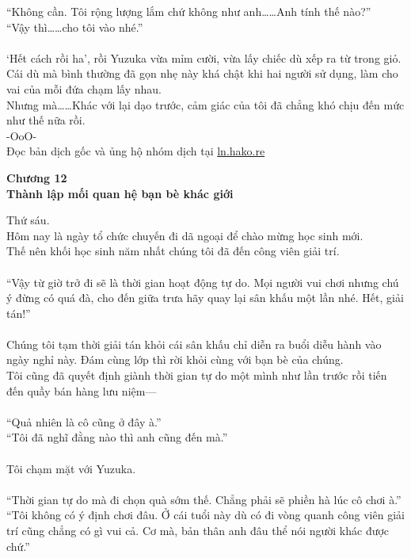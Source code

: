 \documentclass[12pt,a4paper, twosides]{book}
\begin{document}
“Không cần. Tôi rộng lượng lắm chứ không như anh……Anh tính thế nào?”\\
“Vậy thì……cho tôi vào nhé.”\\
\\
‘Hết cách rồi ha’, rồi Yuzuka vừa mỉm cười, vừa lấy chiếc dù xếp ra từ trong giỏ.\\
Cái dù mà bình thường đã gọn nhẹ này khá chật khi hai người sử dụng, làm cho vai của mỗi đứa chạm lấy nhau.\\
Nhưng mà……Khác với lại dạo trước, cảm giác của tôi đã chẳng khó chịu đến mức như thế nữa rồi.\\
-OoO-\\
Đọc bản dịch gốc và ủng hộ nhóm dịch tại \href{https://ln.hako.re/}{ln.hako.re}\\
\newpage

    \begin{center}
    \textbf{\large Chương 12 \\ Thành lập mối quan hệ bạn bè khác giới}
    \end{center}
    \noindent
Thứ sáu.\\
Hôm nay là ngày tổ chức chuyến đi dã ngoại để chào mừng học sinh mới.\\
Thế nên khối học sinh năm nhất chúng tôi đã đến công viên giải trí.\\
\\
“Vậy từ giờ trở đi sẽ là thời gian hoạt động tự do. Mọi người vui chơi nhưng chú ý đừng có quá đà, cho đến giữa trưa hãy quay lại sân khấu một lần nhé. Hết, giải tán!”\\
\\
Chúng tôi tạm thời giải tán khỏi cái sân khấu chỉ diễn ra buổi diễu hành vào ngày nghỉ này. Đám cùng lớp thì rời khỏi cùng với bạn bè của chúng.\\
Tôi cũng đã quyết định giành thời gian tự do một mình như lần trước rồi tiến đến quầy bán hàng lưu niệm—\\
\\
“Quả nhiên là cô cũng ở đây à.”\\
“Tôi đã nghĩ đằng nào thì anh cũng đến mà.”\\
\\
Tôi chạm mặt với Yuzuka.\\
\\
“Thời gian tự do mà đi chọn quà sớm thế. Chẳng phải sẽ phiền hà lúc cô chơi à.”\\
“Tôi không có ý định chơi đâu. Ở cái tuổi này dù có đi vòng quanh công viên giải trí cũng chẳng có gì vui cả. Cơ mà, bản thân anh đâu thể nói người khác được chứ.”\\
\end{document}
